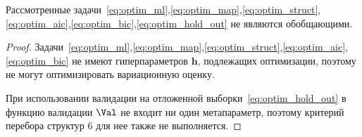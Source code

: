 \begin{theorem}Рассмотренные задачи~\eqref{eq:optim_ml},\eqref{eq:optim_map},\eqref{eq:optim_struct},\eqref{eq:optim_aic},\eqref{eq:optim_bic},\eqref{eq:optim_hold_out} не являются обобщающими.
\end{theorem}
\begin{proof}
Задачи~\eqref{eq:optim_ml},\eqref{eq:optim_map},\eqref{eq:optim_struct},\eqref{eq:optim_aic},\eqref{eq:optim_bic} не имеют гиперпараметров $\mathbf{h}$, подлежащих оптимизации, поэтому не могут оптимизировать вариационную оценку.

При  использовании валидации на отложенной выборки~\eqref{eq:optim_hold_out} в функцию валидации $\Val$ не входит ни один метапараметр, поэтому критерий перебора структур 6 для нее также не выполняется. 

\end{proof}

